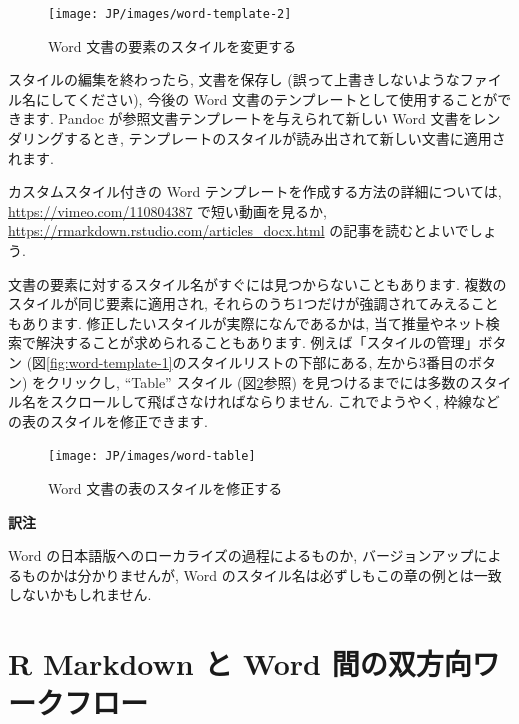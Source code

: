 \documentclass[
  11pt,
  lualatex,ja=standard,jafont=noto]{bxjsreport}
\newenvironment{infobox}[1]{\begin{itemize}\renewcommand{\labelitemi}{\raisebox{-.7\height}[0pt][0pt]{%
  {\setkeys{Gin}{width=3em,keepaspectratio}\texttt{[image: \_latex/\_img/\#1]}}}}
  \setlength{\fboxsep}{1em}
  \begin{greyblock}
  \item
  }{\end{greyblock}\end{itemize}
}
\begin{document}
\begin{figure}

{\centering \texttt{[image: JP/images/word-template-2]} 

}

\caption{Word 文書の要素のスタイルを変更する}\label{fig:word-template-2}
\end{figure}

スタイルの編集を終わったら, 文書を保存し (誤って上書きしないようなファイル名にしてください), 今後の Word 文書のテンプレートとして使用することができます. Pandoc が参照文書テンプレートを与えられて新しい Word 文書をレンダリングするとき, テンプレートのスタイルが読み出されて新しい文書に適用されます.

カスタムスタイル付きの Word テンプレートを作成する方法の詳細については, \url{https://vimeo.com/110804387} で短い動画を見るか, \url{https://rmarkdown.rstudio.com/articles_docx.html} の記事を読むとよいでしょう.

文書の要素に対するスタイル名がすぐには見つからないこともあります. 複数のスタイルが同じ要素に適用され, それらのうち1つだけが強調されてみえることもあります. 修正したいスタイルが実際になんであるかは, 当て推量やネット検索で解決することが求められることもあります. 例えば「スタイルの管理」ボタン (図\ref{fig:word-template-1}のスタイルリストの下部にある, 左から3番目のボタン) をクリックし, ``Table'' スタイル (図\ref{fig:word-table}参照) を見つけるまでには多数のスタイル名をスクロールして飛ばさなければならりません. これでようやく, 枠線などの表のスタイルを修正できます.

\begin{figure}

{\centering \texttt{[image: JP/images/word-table]} 

}

\caption{Word 文書の表のスタイルを修正する}\label{fig:word-table}
\end{figure}

\begin{infobox}{memo}
\textbf{訳注}

Word の日本語版へのローカライズの過程によるものか, バージョンアップによるものかは分かりませんが, Word のスタイル名は必ずしもこの章の例とは一致しないかもしれません.

\end{infobox}

\hypertarget{word-redoc}{%
\section{R Markdown と Word 間の双方向ワークフロー}\label{word-redoc}}
\end{document}

